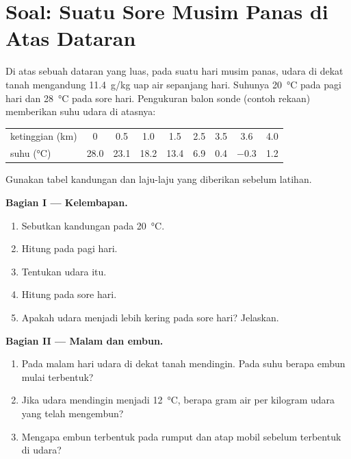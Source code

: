 \section{Soal: Suatu Sore Musim Panas di Atas Dataran}

\begin{problem}
\label{pb:g10:why-clouds-form:1}
Di atas sebuah dataran yang luas, pada suatu hari musim panas, udara di dekat
tanah mengandung \qty{11.4}{g/kg} uap air sepanjang hari. Suhunya
\qty{20}{\degreeCelsius} pada pagi hari dan \qty{28}{\degreeCelsius} pada sore
hari. Pengukuran balon sonde (contoh rekaan) memberikan suhu udara di atasnya:

\begin{center}
\small
\begin{tabular}{l*{8}{c}}
\hline
ketinggian (km) & 0 & 0.5 & 1.0 & 1.5 & 2.5 & 3.5 & 3.6 & 4.0 \\
suhu (\unit{\degreeCelsius}) & 28.0 & 23.1 & 18.2 & 13.4 & 6.9 & 0.4 & $-0.3$ & 1.2 \\
\hline
\end{tabular}
\end{center}

\noindent Gunakan tabel kandungan  dan laju-laju yang diberikan sebelum
latihan.

\medskip
\noindent\textbf{Bagian I --- Kelembapan.}
\begin{enumerate}
  \item Sebutkan kandungan  pada \qty{20}{\degreeCelsius}.
  \item Hitung  pada pagi hari.
  \item Tentukan  udara itu.
  \item Hitung  pada sore hari.
  \item Apakah udara menjadi lebih kering pada sore hari? Jelaskan.
\end{enumerate}

\medskip
\noindent\textbf{Bagian II --- Malam dan embun.}
\begin{enumerate}[resume]
  \item Pada malam hari udara di dekat tanah mendingin. Pada suhu berapa
        embun mulai terbentuk?
  \item Jika udara mendingin menjadi \qty{12}{\degreeCelsius}, berapa gram
        air per kilogram udara yang telah mengembun?
  \item Mengapa embun terbentuk pada rumput dan atap mobil sebelum terbentuk
        di udara?
\end{enumerate}


\end{problem}
